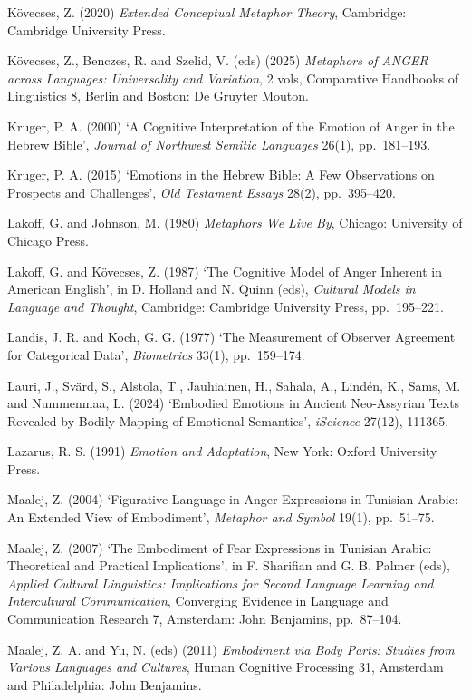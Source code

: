 \documentclass[11pt,a4paper]{article}
\begin{document}
Kövecses, Z. (2020) \emph{Extended Conceptual Metaphor Theory},
Cambridge: Cambridge University Press.

Kövecses, Z., Benczes, R. and Szelid, V. (eds) (2025) \emph{Metaphors of
ANGER across Languages: Universality and Variation}, 2 vols, Comparative
Handbooks of Linguistics 8, Berlin and Boston: De Gruyter Mouton.

Kruger, P. A. (2000) `A Cognitive Interpretation of the Emotion of Anger
in the Hebrew Bible', \emph{Journal of Northwest Semitic Languages}
26(1), pp.~181--193.

Kruger, P. A. (2015) `Emotions in the Hebrew Bible: A Few Observations
on Prospects and Challenges', \emph{Old Testament Essays} 28(2),
pp.~395--420.

Lakoff, G. and Johnson, M. (1980) \emph{Metaphors We Live By}, Chicago:
University of Chicago Press.

Lakoff, G. and Kövecses, Z. (1987) `The Cognitive Model of Anger
Inherent in American English', in D. Holland and N. Quinn (eds),
\emph{Cultural Models in Language and Thought}, Cambridge: Cambridge
University Press, pp.~195--221.

Landis, J. R. and Koch, G. G. (1977) `The Measurement of Observer
Agreement for Categorical Data', \emph{Biometrics} 33(1), pp.~159--174.

Lauri, J., Svärd, S., Alstola, T., Jauhiainen, H., Sahala, A., Lindén,
K., Sams, M. and Nummenmaa, L. (2024) `Embodied Emotions in Ancient
Neo-Assyrian Texts Revealed by Bodily Mapping of Emotional Semantics',
\emph{iScience} 27(12), 111365.

Lazarus, R. S. (1991) \emph{Emotion and Adaptation}, New York: Oxford
University Press.

Maalej, Z. (2004) `Figurative Language in Anger Expressions in Tunisian
Arabic: An Extended View of Embodiment', \emph{Metaphor and Symbol}
19(1), pp.~51--75.

Maalej, Z. (2007) `The Embodiment of Fear Expressions in Tunisian
Arabic: Theoretical and Practical Implications', in F. Sharifian and G.
B. Palmer (eds), \emph{Applied Cultural Linguistics: Implications for
Second Language Learning and Intercultural Communication}, Converging
Evidence in Language and Communication Research 7, Amsterdam: John
Benjamins, pp.~87--104.

Maalej, Z. A. and Yu, N. (eds) (2011) \emph{Embodiment via Body Parts:
Studies from Various Languages and Cultures}, Human Cognitive Processing
31, Amsterdam and Philadelphia: John Benjamins.
\end{document}
